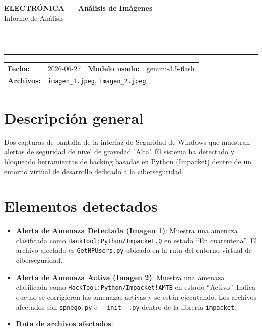 \documentclass[11pt,a4paper]{article}
\begin{document}
\begin{center}
  {\Large\bfseries\color{azulTitulo} ELECTRÓNICA --- Análisis de Imágenes}\\[4pt]
  {\large Informe de Análisis}\\[12pt]
  \rule{\linewidth}{1.2pt}\\[6pt]
  \rule{\linewidth}{0.6pt}
\end{center}

\vspace{4pt}
\begin{tcolorbox}[cajaTitulo, title=Datos del análisis]
\begin{tabular}{@{}llll@{}}
  \textbf{Fecha:}       & 2026-06-27  &
  \textbf{Modelo usado:} & gemini-3.5-flash \\[4pt]
  \textbf{Archivos:}    & \multicolumn{3}{l}{\texttt{imagen\_1.jpeg}, \texttt{imagen\_2.jpeg}} \\
\end{tabular}
\end{tcolorbox}

\section*{Descripción general}
Dos capturas de pantalla de la interfaz de Seguridad de Windows que muestran alertas de seguridad de nivel de gravedad 'Alta'. El sistema ha detectado y bloqueado herramientas de hacking basadas en Python (Impacket) dentro de un entorno virtual de desarrollo dedicado a la ciberseguridad.

\section*{Elementos detectados}
\begin{itemize}[leftmargin=1.5em, itemsep=2pt]
  \item \textbf{Alerta de Amenaza Detectada (Imagen 1)}: Muestra una amenaza clasificada como
    \texttt{HackTool:Python/Impacket.Q} en estado ``En cuarentena''. El archivo afectado es
    \texttt{GetNPUsers.py} ubicado en la ruta del entorno virtual de ciberseguridad.
  \item \textbf{Alerta de Amenaza Activa (Imagen 2)}: Muestra una amenaza clasificada como
    \texttt{HackTool:Python/Impacket!AMTB} en estado ``Activo''. Indica que no se corrigieron
    las amenazas activas y se están ejecutando. Los archivos afectados son
    \texttt{spnego.py} e \texttt{\_\_init\_\_.py} dentro de la librería \texttt{impacket}.
  \item \textbf{Ruta de archivos afectados}:

\end{itemize}
\end{document}
